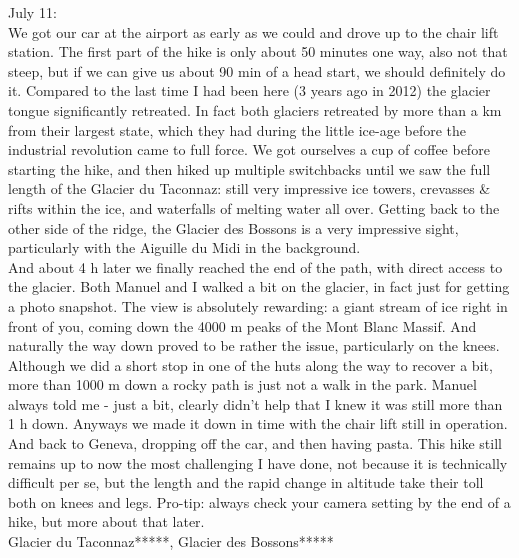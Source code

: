 July 11:\\
We got our car at the airport as early as we could and drove up to the chair lift station. The first part of the hike is only about 50 minutes one way, also not that steep, but if we can give us about 90 min of a head start, we should definitely do it. Compared to the last time I had been here (3 years ago in 2012) the glacier tongue significantly retreated. In fact both glaciers retreated by more than a km from their largest state, which they had during the little ice-age before the industrial revolution came to full force. We got ourselves a cup of coffee before starting the hike, and then hiked up multiple switchbacks until we saw the full length of the Glacier du Taconnaz: still very impressive ice towers, crevasses \& rifts within the ice, and waterfalls of melting water all over. Getting back to the other side of the ridge, the Glacier des Bossons is a very impressive sight, particularly with the Aiguille du Midi in the background. \\
And about 4 h later we finally reached the end of the path, with direct access to the glacier. Both Manuel and I walked a bit on the glacier, in fact just for getting a photo snapshot. The view is absolutely rewarding: a giant stream of ice right in front of you, coming down the 4000 m peaks of the Mont Blanc Massif. And naturally the way down proved to be rather the issue, particularly on the knees. Although we did a short stop in one of the huts along the way to recover a bit, more than 1000 m down a rocky path is just not a walk in the park. Manuel always told me - just a bit, clearly didn't help that I knew it was still more than 1 h down. Anyways we made it down in time with the chair lift still in operation. And back to Geneva, dropping off the car, and then having pasta. This hike still remains up to now the most challenging I have done, not because it is technically difficult per se, but the length and the rapid change in altitude take their toll both on knees and legs. Pro-tip: always check your camera setting by the end of a hike, but more about that later.\\

Glacier du Taconnaz*****, Glacier des Bossons*****


